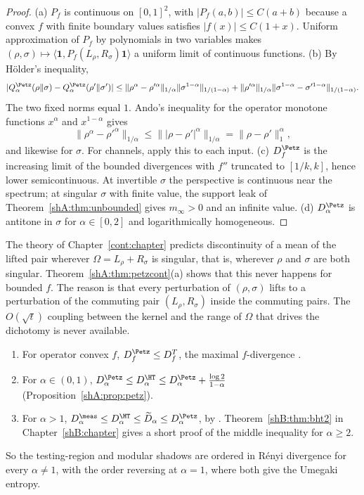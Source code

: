 \begin{proof}
(a) $P_f$ is continuous on $[0,1]^2$, with $|P_f(a,b)|\le C(a+b)$ because a convex $f$ with finite boundary values satisfies $|f(x)|\le C(1+x)$. Uniform approximation of $P_f$ by polynomials in two variables makes $(\rho,\sigma)\mapsto\langle\mathbf 1,P_f(L_\rho,R_\sigma)\mathbf 1\rangle$ a uniform limit of continuous functions. (b) By H\"older's inequality,
\[
|Q^\Petz_\alpha(\rho\|\sigma)-Q^\Petz_\alpha(\rho'\|\sigma')|\le\|\rho^\alpha-\rho'^\alpha\|_{1/\alpha}\|\sigma^{1-\alpha}\|_{1/(1-\alpha)}+\|\rho'^\alpha\|_{1/\alpha}\|\sigma^{1-\alpha}-\sigma'^{1-\alpha}\|_{1/(1-\alpha)} .
\]
The two fixed norms equal $1$. Ando's inequality for the operator monotone functions $x^\alpha$ and $x^{1-\alpha}$ \cite{Ando1988} gives
\[
\|\rho^\alpha-\rho'^\alpha\|_{1/\alpha}\le\||\rho-\rho'|^\alpha\|_{1/\alpha}=\|\rho-\rho'\|_1^\alpha,
\]
and likewise for $\sigma$. For channels, apply this to each input. (c) $D^\Petz_f$ is the increasing limit of the bounded divergences with $f''$ truncated to $[1/k,k]$, hence lower semicontinuous. At invertible $\sigma$ the perspective is continuous near the spectrum; at singular $\sigma$ with finite value, the support leak of Theorem~\ref{shA:thm:unbounded} gives $m_\infty>0$ and an infinite value. (d) $D^\Petz_\alpha$ is antitone in $\sigma$ for $\alpha\in[0,2]$ and logarithmically homogeneous.
\end{proof}

The theory of Chapter~\ref{cont:chapter} predicts discontinuity of a mean of the lifted pair wherever $\Omega=L_\rho+R_\sigma$ is singular, that is, wherever $\rho$ and $\sigma$ are both singular. Theorem~\ref{shA:thm:petzcont}(a) shows that this never happens for bounded $f$. The reason is that every perturbation of $(\rho,\sigma)$ lifts to a perturbation of the commuting pair $(L_\rho,R_\sigma)$ inside the commuting pairs. The $O(\sqrt t)$ coupling between the kernel and the range of $\Omega$ that drives the dichotomy is never available.

\begin{proposition}\label{shA:prop:petzorder}
\begin{enumerate}[label=(\alph*)]
\item For operator convex $f$, $D^\Petz_f\le D^T_f$, the maximal $f$-divergence \cite{HiaiMosonyi2017,Matsumoto2018newf}.
\item For $\alpha\in(0,1)$, $D^\Petz_\alpha\le D^\HT_\alpha\le D^\Petz_\alpha+\frac{\log2}{1-\alpha}$ (Proposition~\ref{shA:prop:petz}).
\item For $\alpha>1$, $D^\meas_\alpha\le D^\HT_\alpha\le\widetilde D_\alpha\le D^\Petz_\alpha$, by \cite{LiuHircheCheng2025}. Theorem~\ref{shB:thm:bht2} in Chapter~\ref{shB:chapter} gives a short proof of the middle inequality for $\alpha\ge2$.
\end{enumerate}
So the testing-region and modular shadows are ordered in R\'enyi divergence for every $\alpha\ne1$, with the order reversing at $\alpha=1$, where both give the Umegaki entropy.
\end{proposition}

